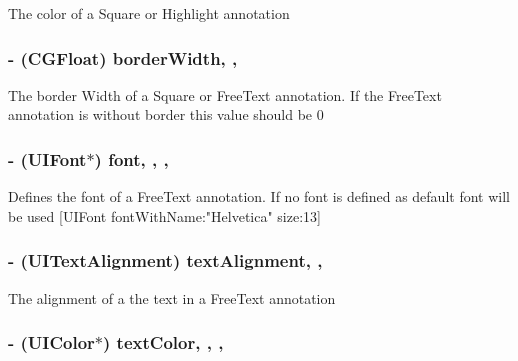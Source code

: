 The color of a Square or Highlight annotation \hypertarget{interface_a_p_d_f_annotation_a835dbd5060e5a2c982ed3da97d2a90de}{
\subsubsection[{border\-Width}]{\setlength{\rightskip}{0pt plus 5cm}-\/ (C\-G\-Float) border\-Width\hspace{0.3cm}{\ttfamily [read]}, {\ttfamily [write]}, {\ttfamily [atomic]}}}\label{interface_a_p_d_f_annotation_a835dbd5060e5a2c982ed3da97d2a90de}
The border Width of a Square or Free\-Text annotation. If the Free\-Text annotation is without border this value should be 0 \hypertarget{interface_a_p_d_f_annotation_a9c2cdd317cf382753204627ee4fed4fb}{
\subsubsection[{font}]{\setlength{\rightskip}{0pt plus 5cm}-\/ (U\-I\-Font$\ast$) font\hspace{0.3cm}{\ttfamily [read]}, {\ttfamily [write]}, {\ttfamily [nonatomic]}, {\ttfamily [retain]}}}\label{interface_a_p_d_f_annotation_a9c2cdd317cf382753204627ee4fed4fb}
Defines the font of a Free\-Text annotation. If no font is defined as default font will be used \mbox{[}U\-I\-Font font\-With\-Name\-:"Helvetica" size\-:13\mbox{]} \hypertarget{interface_a_p_d_f_annotation_afaac76ef1a7c19ee46e05315828f3283}{
\subsubsection[{text\-Alignment}]{\setlength{\rightskip}{0pt plus 5cm}-\/ (U\-I\-Text\-Alignment) text\-Alignment\hspace{0.3cm}{\ttfamily [read]}, {\ttfamily [write]}, {\ttfamily [atomic]}}}\label{interface_a_p_d_f_annotation_afaac76ef1a7c19ee46e05315828f3283}
The alignment of a the text in a Free\-Text annotation \hypertarget{interface_a_p_d_f_annotation_a2d67df8bfd2b3d4182ee5a88a6e916ff}{
\subsubsection[{text\-Color}]{\setlength{\rightskip}{0pt plus 5cm}-\/ (U\-I\-Color$\ast$) text\-Color\hspace{0.3cm}{\ttfamily [read]}, {\ttfamily [write]}, {\ttfamily [nonatomic]}, {\ttfamily [retain]}}}\label{interface_a_p_d_f_annotation_a2d67df8bfd2b3d4182ee5a88a6e916ff}
